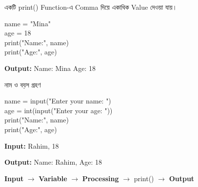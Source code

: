 

একটি
\textenglish{\ttfamily print()}
Function-এ Comma দিয়ে একাধিক Value দেওয়া যায়।

\begin{codebox}
\begin{english}
\ttfamily
name = "Mina"\\
age = 18\\
print("Name:", name)\\
print("Age:", age)
\end{english}
\end{codebox}

\textbf{Output:}
\quad
\textenglish{\ttfamily Name: Mina}
\qquad
\textenglish{\ttfamily Age: 18}



\begin{examplebox}{নাম ও বয়স গ্রহণ}

\begin{codebox}
\begin{english}
\ttfamily
name = input("Enter your name: ")\\
age = int(input("Enter your age: "))\\
print("Name:", name)\\
print("Age:", age)
\end{english}
\end{codebox}

\textbf{Input:}
\quad
\textenglish{\ttfamily Rahim, 18}

\qquad
\textbf{Output:}
\quad
\textenglish{\ttfamily Name: Rahim, Age: 18}

\end{examplebox}

\begin{center}
\textbf{Input}
\(\longrightarrow\)
\textbf{Variable}
\(\longrightarrow\)
\textbf{Processing}
\(\longrightarrow\)
\textenglish{\ttfamily print()}
\(\longrightarrow\)
\textbf{Output}
\end{center}



